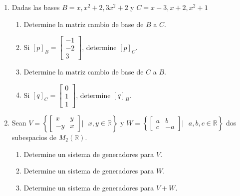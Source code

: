 \documentclass[12pt]{article}
\begin{document}
\begin{enumerate}
    \item Dadas las bases $B={x,x^2+2,3x^2+2}$ y $C={x-3,x+2,x^2+1}$
          \begin{enumerate}
              \item Determine la matriz cambio de base de $B$ a $C$.
              \item Si $[p]_B=
                        \begin{bmatrix}
                            -1 \\
                            -2 \\
                            3
                        \end{bmatrix}$, determine $[p]_C$.
              \item Determine la matriz cambio de base de $C$ a $B$.
              \item Si $[q]_C=
                        \begin{bmatrix}
                            0 \\
                            1 \\
                            1
                        \end{bmatrix}$, determine $[q]_B$.
          \end{enumerate}

    \item Sean $V=\left\{\begin{bmatrix}
                  x  & y \\
                  -y & x
              \end{bmatrix}|\mbox{ }x,y \in \mathbb{R}\right\}$ y
          $W=\left\{\begin{bmatrix}
                  a & b  \\
                  c & -a
              \end{bmatrix}|\mbox{ }a,b,c \in \mathbb{R}\right\}$
          dos subespacios de $M_2(\mathbb{R})$.
          \begin{enumerate}
              \item Determine un sistema de generadores para $V$.
              \item Determine un sistema de generadores para $W$.
              \item Determine un sistema de generadores para $V+W$.
          \end{enumerate}


\end{enumerate}
\end{document}
